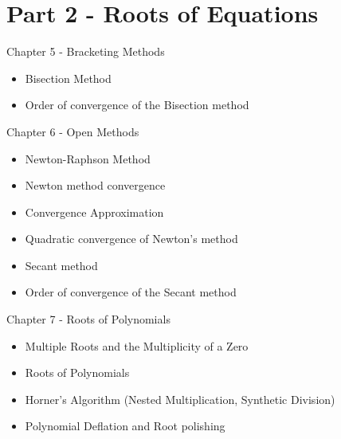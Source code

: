 \documentclass[12pt]{beamer}
\begin{document}
\section{Part 2 - Roots of Equations}

\begin{frame}{Chapter 5 - Bracketing Methods}

\begin{itemize}

\item{Bisection Method}

\item{Order of convergence of the Bisection method} 

\end{itemize}

\end{frame}

\begin{frame}{Chapter 6 - Open Methods}

\begin{itemize}

\item{Newton-Raphson Method}

\item{Newton method convergence}  

\item{Convergence Approximation}

\item{Quadratic convergence of Newton's method} 

\item{Secant method} 

\item{Order of convergence of the Secant method} 

\end{itemize}

\end{frame}

\begin{frame}{Chapter 7 - Roots of Polynomials}

\begin{itemize}

\item{Multiple Roots and the Multiplicity of a Zero} 

\item{Roots of Polynomials} 

\item{Horner's Algorithm (Nested Multiplication, Synthetic Division)} 

\item{Polynomial Deflation and Root polishing} 

\end{itemize}

\end{frame}
\end{document}
